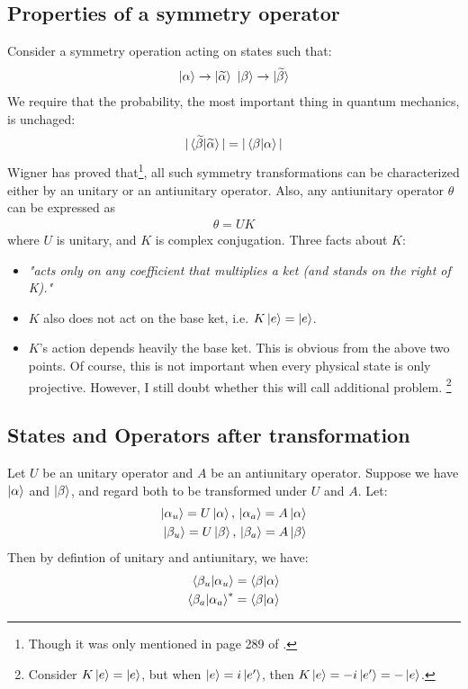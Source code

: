 \documentclass{article}
\numberwithin{equation}{subsection} %
\theoremstyle{definition}
\begin{document}
\subsection{Properties of a symmetry operator}
\label{sec:Property-of-symmetry-operator}
Consider a symmetry operation acting on states such that:
\begin{align}
    \ket{\alpha}\to \ket{\widetilde{\alpha}}\,\,
    \ket{\beta}\to \ket{\widetilde{\beta}}
\end{align}
We require that the probability, the most important thing in quantum
mechanics, is unchaged:
\begin{align}
    |\braket{\widetilde{\beta}|\widetilde{\alpha}}| =
        |\braket{\beta|\alpha}|
\end{align}
Wigner has proved that\footnote{
Though it was only mentioned in page 289 of \cite{sakurai}.},
all such symmetry transformations can be characterized either by an unitary
or an antiunitary operator. Also, any antiunitary operator $\theta$ can be
expressed as
\begin{align}
    \theta = U K
\end{align}
where $U$ is unitary, and $K$ is complex conjugation. Three facts about
$K$:
\begin{itemize}
    \item \textit{"acts only on any coefficient that multiplies a ket
        (and stands on the right of K)."} 
    \item $K$ also does not act on the base ket, i.e. $K\ket{e}=\ket{e}$.
    \item $K$'s action depends heavily the base ket. This is obvious from
        the above two points. Of course, this is not important when every
        physical state is only projective. However, I still doubt whether
        this will call additional problem.
        \footnote{Consider $K\ket{e}=\ket{e}$, but when
        $\ket{e}=i\ket{e'}$, then $K\ket{e}=-i\ket{e'}=-\ket{e}$.}
\end{itemize}

\subsection{States and Operators after transformation}
\label{sec:States-and-Operators-after-transformation}
Let $U$ be an unitary operator and $A$ be an antiunitary operator. Suppose
we have $\ket{\alpha}$ and $\ket{\beta}$, and regard both to be
transformed under $U$ and $A$. Let:
\begin{align}
    \ket{\alpha_u}=U\ket{\alpha},\, \ket{\alpha_a}=A\ket{\alpha} \\
    \ket{\beta_u}=U\ket{\beta},\, \ket{\beta_a}=A\ket{\beta}
\end{align}
Then by defintion of unitary and antiunitary, we have:
\begin{align}
    \braket{\beta_u|\alpha_u} &=\braket{\beta|\alpha} \\
    \braket{\beta_a|\alpha_a}^* &=\braket{\beta|\alpha}
\end{align}
\end{document}
